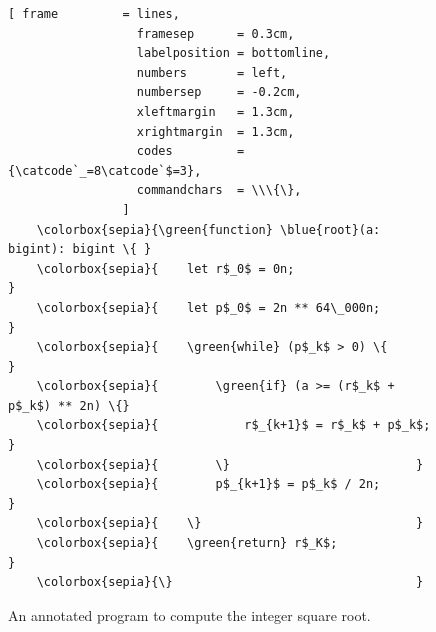 \begin{figure}[!h]
\centering
\begin{Verbatim}[ frame         = lines, 
                  framesep      = 0.3cm, 
                  labelposition = bottomline,
                  numbers       = left,
                  numbersep     = -0.2cm,
                  xleftmargin   = 1.3cm,
                  xrightmargin  = 1.3cm,
                  codes         = {\catcode`_=8\catcode`$=3},
                  commandchars  = \\\{\},
                ]
    \colorbox{sepia}{\green{function} \blue{root}(a: bigint): bigint \{ }
    \colorbox{sepia}{    let r$_0$ = 0n;                   }
    \colorbox{sepia}{    let p$_0$ = 2n ** 64\_000n;        }
    \colorbox{sepia}{    \green{while} (p$_k$ > 0) \{               }
    \colorbox{sepia}{        \green{if} (a >= (r$_k$ + p$_k$) ** 2n) \{}
    \colorbox{sepia}{            r$_{k+1}$ = r$_k$ + p$_k$;         }
    \colorbox{sepia}{        \}                          }
    \colorbox{sepia}{        p$_{k+1}$ = p$_k$ / 2n;             }
    \colorbox{sepia}{    \}                              }
    \colorbox{sepia}{    \green{return} r$_K$;                     }
    \colorbox{sepia}{\}                                  }
\end{Verbatim}
\vspace*{-0.3cm}
\caption{An annotated program to compute the integer square root.}
\label{fig:Integer-Square-Root-Iterative.ipynb}
\end{figure} %


